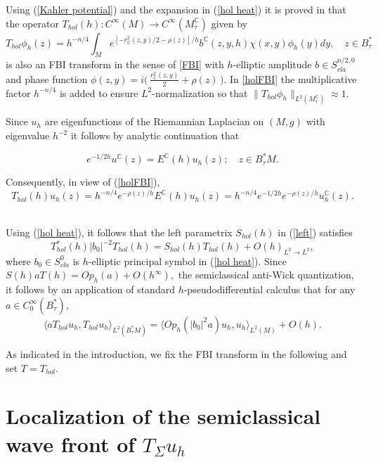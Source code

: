 \documentclass[11pt,reqno]{amsart}
\newcommand{\C}{{\mathbb C}}
\theoremstyle{definition}
\begin{document}
Using (\ref{Kahler potential}) and the expansion in (\ref{hol heat}) it is proved in \cite [Theorem 0.1]{GLS96}  that the operator $T_{hol}(h): C^{\infty}(
M) \to C^{\infty}(M_{\tau}^{\C})$ given by
%
\begin{equation} \label{holFBI}
T_{hol} \phi_h (z) = h^{-n/4} \int_{M} e^{ [ - r_{\C}^2(z,y)/2 - \rho(z)]/h} b^{\C}(z,y,h) \chi(x,y) \phi_h(y) dy, \quad z \in B_{\tau}^* \end{equation}
is also an FBI transform in the sense of \eqref{FBI} with $h$-elliptic amplitude  $b \in S^{n/2,0}_{cla}$ and phase function
%
$\phi(z,y) = i  \Big( \, \frac{ r_{\C}^2(z,y)}{2} + \rho(z) \, \Big). $
%
In \eqref{holFBI} the multiplicative factor $h^{-n/4}$ is added to ensure $L^2$-normalization so that $\| T_{hol} \phi_h \|_{L^2(M_{\tau}^{\C})} \approx  1.$

Since $u_h$ are eigenfunctions of the Riemannian Laplacian on $(M,g)$ with eigenvalue $h^{-2}$ it follows by analytic continuation that 

$$ e^{-1/2h} u^{\C}(z) = E^{\C}(h) u_h (z); \quad z \in B_{\tau}^*M.$$

Consequently, in view of (\ref{holFBI}),
\begin{equation} \label{comp}
T_{hol}(h) u_h (z) = h^{-n/4}e^{-\rho(z)/h} E^{\C}(h) u_h (z) = h^{-n/4}e^{-1/2h} e^{-\rho(z)/h} u_h^{\C}(z). \end{equation} \

Using (\ref{hol heat}), it follows that the left parametrix $S_{hol}(h)$ in (\ref{left}) satisfies
$$  T^*_{hol}(h) |b_0|^{-2} T_{hol}(h) = S_{hol}(h) T_{hol}(h)  + O(h)_{L^2 \to L^2},$$
where $b_0 \in S^{0}_{cla}$ is $h$-elliptic principal symbol in (\ref{hol heat}).
Since $S(h) a T(h) = Op_{h}(a) + O(h^{\infty}),$ the semiclassical anti-Wick quantization, it follows by an application of standard 
$h$-pseudodifferential calculus that for any $a \in C^{\infty}_{0}(B^*_{\tau}),$
\begin{equation} \label{key psdo}
\langle a T_{hol} u_h, T_{hol} u_h \rangle_{L^2(B_{\tau}^*M)} = \langle Op_h(|b_0|^2 a) u_h, u_h \rangle_{L^2(M)} + O(h). \end{equation}  

As indicated in the introduction, we fix the FBI transform in the following and set $T = T_{hol}.$





\section{Localization of the semiclassical wave front of $T_{\Sigma} u_h$} \label{WF}
\end{document}
